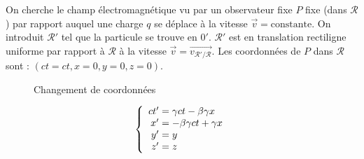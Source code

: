 \begin{app}
	On cherche le champ électromagnétique vu par un observateur fixe $P$ fixe (dans $\mathcal{R}$) par rapport auquel une charge $q$ se déplace à la vitesse $\vec{v}=\text{constante}$. On introduit $\mathcal{R'}$ tel que la particule se trouve en $0'$. $\mathcal{R'}$ est en translation rectiligne uniforme par rapport à $\mathcal{R}$ à la vitesse $\vec{v}=\vec{v_{\mathcal{R'}/\mathcal{R}}}$. Les coordonnées de $P$ dans $\mathcal{R}$ sont : $(ct=ct,x=0,y=0,z=0)$.
\begin{center}
	\begin{minipage}{0.45\textwidth}
		\begin{figure}[H]
			\centering
			
			\caption*{Changement de coordonnées}
		\end{figure}
	\end{minipage}
	\begin{minipage}{0.45\textwidth}
		{\renewcommand*{\arraystretch}{1.2}$$
			\left\{ \begin{array}{r@{\;}l}
				ct'&=\gamma ct-\beta\gamma x\\
				x'&=-\beta\gamma ct+\gamma x\\
				y'&=y\\
				z'&=z
			\end{array} \right.
		$$}
	\end{minipage}
\end{center}


\end{app}
